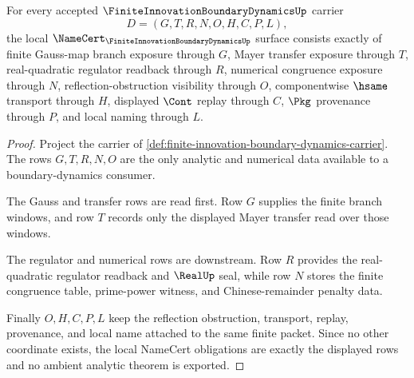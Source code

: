 \begin{theorem}
\label{thm:finite-innovation-boundary-dynamics-namecert-obligations}
For every accepted $\FiniteInnovationBoundaryDynamicsUp$ carrier
$$
D=(G,T,R,N,O,H,C,P,L),
$$
the local $\NameCert_{\FiniteInnovationBoundaryDynamicsUp}$ surface consists exactly of finite Gauss-map branch exposure through $G$, Mayer transfer exposure through $T$, real-quadratic regulator readback through $R$, numerical congruence exposure through $N$, reflection-obstruction visibility through $O$, componentwise $\hsame$ transport through $H$, displayed $\Cont$ replay through $C$, $\Pkg$ provenance through $P$, and local naming through $L$.
\end{theorem}
\begin{proof}
Project the carrier of \autoref{def:finite-innovation-boundary-dynamics-carrier}. The rows $G,T,R,N,O$ are the only analytic and numerical data available to a boundary-dynamics consumer.

The Gauss and transfer rows are read first. Row $G$ supplies the finite branch windows, and row $T$ records only the displayed Mayer transfer read over those windows.

The regulator and numerical rows are downstream. Row $R$ provides the real-quadratic regulator readback and $\RealUp$ seal, while row $N$ stores the finite congruence table, prime-power witness, and Chinese-remainder penalty data.

Finally $O,H,C,P,L$ keep the reflection obstruction, transport, replay, provenance, and local name attached to the same finite packet. Since no other coordinate exists, the local NameCert obligations are exactly the displayed rows and no ambient analytic theorem is exported.
\end{proof}

